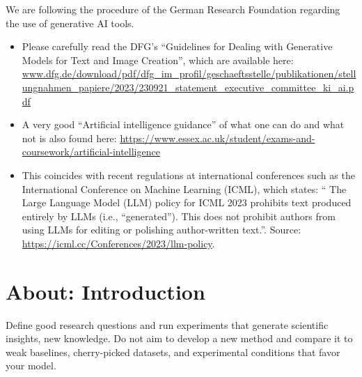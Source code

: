 \documentclass[manuscript, nonacm]{acmart}
\begin{document}
\begin{tcolorbox}[title=Note on the Use of Generative AI Tools]


We are following the procedure of the German Research Foundation regarding the use of generative AI tools.
%
\begin{itemize}
\item Please carefully read the DFG's ``Guidelines for Dealing with Generative Models for Text and Image Creation'', which are available here: 
\url{www.dfg.de/download/pdf/dfg_im_profil/geschaeftsstelle/publikationen/stellungnahmen_papiere/2023/230921_statement_executive_committee_ki_ai.pdf}

\item A very good ``Artificial intelligence guidance'' of what one can do and what not is also found here:
\url{https://www.essex.ac.uk/student/exams-and-coursework/artificial-intelligence}

\item This coincides with recent regulations at international conferences such as the International Conference on Machine Learning (ICML), which states: `` The Large Language Model (LLM) policy for ICML 2023 prohibits text produced entirely by LLMs (i.e., “generated”).  This does not prohibit authors from using LLMs for editing or polishing author-written text.''. Source: \url{https://icml.cc/Conferences/2023/llm-policy}.
\end{itemize}

\end{tcolorbox}







\section{About: Introduction}

\begin{tcolorbox}[title=What is Ego-less Research?,colback=red!20]
Define good research questions and run experiments that generate scientific insights, \ie new knowledge.
Do not aim to develop a new method and compare it to weak baselines, cherry-picked datasets, and experimental conditions that favor your model.
\end{tcolorbox}
\end{document}
